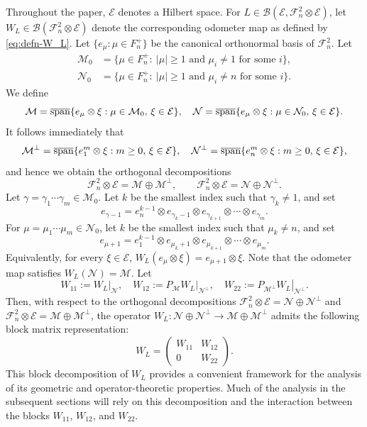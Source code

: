 \documentclass[12pt]{amsart}
\theoremstyle{definition}
\theoremstyle{remark}
\newcommand{\clb}{\mathcal{B}}
\newcommand{\cle}{\mathcal{E}}
\newcommand{\clm}{\mathcal{M}}
\newcommand{\cln}{\mathcal{N}}
\newcommand{\clf}{\mathcal{F}}
\newcommand{\ol}{\overline}
\newcommand\restr[2]{\ensuremath{\left.#1\right|_{#2}}}
\numberwithin{equation}{section}
\begin{document}
Throughout the paper, $\cle$ denotes a Hilbert space.  For $L \in \clb(\cle, \clf_n^2 \otimes \cle)$, let $W_L \in \clb( \clf_n^2 \otimes \cle)$ denote the corresponding odometer map as defined by \eqref{eq:defn-W_L}. Let $\{e_\mu : \mu \in F_n^+\}$ be the canonical orthonormal basis of $\clf_n^2$. 
Let 
\[
\begin{aligned}
\clm_0
&=
\{\mu\in F_n^+:\ |\mu|\geq 1
\text{ and } \mu_i\neq 1 \text{ for some } i\},\\
\cln_0
&=
\{\mu\in F_n^+:\ |\mu|\geq 1
\text{ and } \mu_i\neq n \text{ for some } i\}.
\end{aligned}
\]
We define
\begin{equation}\label{eq:Clm-Cln}
\clm= \ol{\rm span}\{ e_{\mu} \otimes \xi :\mu \in \clm_0,\, \xi \in \cle  \}, \quad
\cln=\ol{\rm span}\{ e_{\mu} \otimes \xi : \mu \in \cln_0,\, \xi \in \cle\}.
\end{equation}
It follows immediately that
\begin{equation}\label{eq:Clm-Cln-Perp}
\clm^{\perp}=\ol{\rm span}\{ e_{1}^{m} \otimes \xi: m \geq 0,\,  \xi \in \cle \},\quad \cln^{\perp}
=\ol{\rm span}\{ e_{n}^{m} \otimes \xi:  m \geq 0,\, \xi \in \cle \},
\end{equation}
and hence we obtain the orthogonal decompositions
\[
\clf_n^2\otimes\cle=\clm\oplus\clm^\perp,
\qquad
\clf_n^2\otimes\cle=\cln\oplus\cln^\perp.
\]
Let \(\gamma=\gamma_1\cdots\gamma_m\in\clm_0\). Let \(k\) be the smallest index such that \(\gamma_k\neq 1\), and set
\[
e_{\gamma-1}
=
e_n^{k-1}\otimes e_{\gamma_k-1}\otimes e_{\gamma_{k+1}}\otimes\cdots\otimes e_{\gamma_m}.
\]
For \(\mu=\mu_1\cdots\mu_m\in\cln_0\), let \(k\) be the smallest index such that \(\mu_k\neq n\), and set
\begin{equation}\label{eq: e_mu+1}
e_{\mu+1}
=
e_1^{k-1}\otimes e_{\mu_k+1}\otimes e_{\mu_{k+1}}\otimes \cdots \otimes e_{\mu_m}.
\end{equation}
Equivalently, for every \(\xi\in\cle\),
$W_L(e_\mu\otimes \xi)=e_{\mu+1}\otimes \xi.$
Note that the odometer map satisfies $W_L(\cln)=\clm.$
Let
\[
W_{11}:=\restr{W_L}{\cln}, \quad W_{12}:= \restr{P_{\clm} W_L}{\cln^{\perp}}, \quad W_{22}:= \restr{P_{\clm^{\perp}} W_L}{\cln^{\perp}}.
\]
Then, with respect to the orthogonal decompositions $\clf_n^2 \otimes \cle = \cln \oplus \cln^\perp$ and $\clf_n^2 \otimes \cle = \clm \oplus \clm^\perp$, the operator $W_L : \cln \oplus \cln^\perp \to \clm \oplus \clm^\perp$
admits the following block matrix representation:
\begin{equation}\label{eq:matrix representation}
 W_L=
\begin{pmatrix}
W_{11} & W_{12} \\
0 & W_{22}
\end{pmatrix}.   
\end{equation}
This block decomposition of $W_L$ provides a convenient framework for the analysis of its geometric and operator-theoretic properties.
Much of the analysis in the subsequent sections will rely on this decomposition and the interaction between the blocks $W_{11}$, $W_{12}$, and $W_{22}$.
\end{document}
